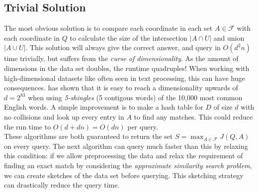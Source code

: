 \subsection{Trivial Solution}
The most obvious solution is to compare each coordinate in each set $A\in \mathcal{F}$ with each coordinate in $Q$ to calculate the size of the intersection $|A\cap U|$ and union $|A \cup U|$. This solution will always give the correct answer, and query in $O(d^2n)$ time trivially, but suffers from the \textit{curse of dimensionality}. As the amount of dimensions in the data set doubles, the runtime quadruples! When working with high-dimensional datasets like often seen in text processing, this can have huge consequences. \citet{li2011hashing} has shown that it is easy to reach a dimensionality upwards of $d=2^{83}$ when using \textit{5-shingles} (5 contigous words) of the 10,000 most common English words.
A simple improvement is to make a hash table for $D$ of size $d$ with no collisions and look up every entry in $A$ to find any matches. This could reduce the run time to $O(d+dn)= O(dn)$ per query.\\
These algorithms are both guaranteed to return the set $S=\max_{A \in \mathcal{F}}J(Q,A)$ on every query. The next algorithm can query much faster than this by relaxing this condition: if we allow preprocessing the data and relax the requirement of finding an exact match by considering the \textit{approximate similarity search problem}, we can create sketches of the data set before querying. This sketching strategy can drastically reduce the query time.
